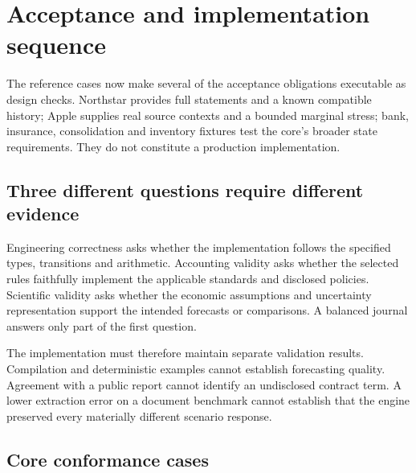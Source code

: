 \chapter{Acceptance and implementation sequence}
\label{ch:validation}

The reference cases now make several of the acceptance obligations executable
as design checks. Northstar provides full statements and a known compatible
history; Apple supplies real source contexts and a bounded marginal stress;
bank, insurance, consolidation and inventory fixtures test the core's broader
state requirements. They do not constitute a production implementation.

\section{Three different questions require different evidence}

Engineering correctness asks whether the implementation follows the specified
types, transitions and arithmetic. Accounting validity asks whether the
selected rules faithfully implement the applicable standards and disclosed
policies. Scientific validity asks whether the economic assumptions and
uncertainty representation support the intended forecasts or comparisons.
A balanced journal answers only part of the first question.

The implementation must therefore maintain separate validation results.
Compilation and deterministic examples cannot establish forecasting quality.
Agreement with a public report cannot identify an undisclosed contract term.
A lower extraction error on a document benchmark cannot establish that the
engine preserved every materially different scenario response.

\section{Core conformance cases}

